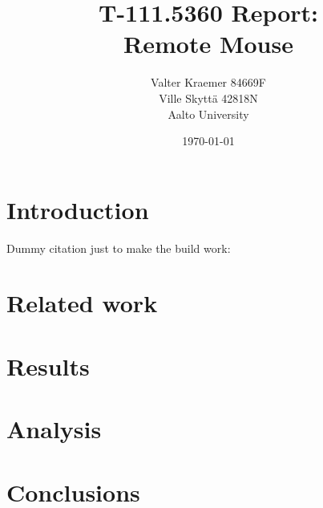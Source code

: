 \documentclass[12pt,a4paper,english,oneside]{article}
\begin{document}
\title{T-111.5360 Report:\\[5mm]
Remote Mouse}

\author{Valter Kraemer 84669F \\
  Ville Skyttä 42818N \\
Aalto University}

\date{\today}

\maketitle


\section{Introduction}

Dummy citation just to make the build work: \citep{bassbouss}

\section{Related work}

\section{Results}

\section{Analysis}

\section{Conclusions}






\end{document}
